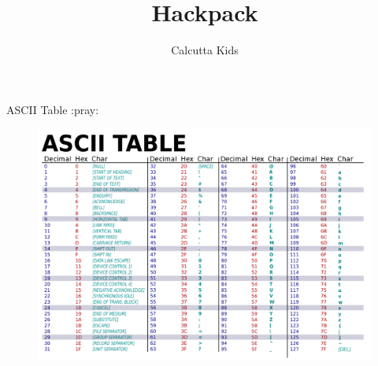 \documentclass[11pt]{scrartcl}
\title{Hackpack}
\author{Calcutta Kids}
\date{}
\begin{document}
\maketitle

ASCII Table :pray:
\begin{figure}[H]
    \centering
    \includegraphics[width=12cm]{bob.png}
    \label{fig:my_label}
\end{figure}
\end{document}

